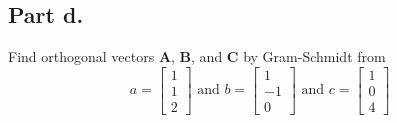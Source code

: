 \subsection{Part d.}
Find orthogonal vectors $\mathbf{A}$, $\mathbf{B}$, and $\mathbf{C}$ by
Gram-Schmidt from
\begin{equation}
    a = 
    \begin{bmatrix}
        1       \\
        1       \\
        2
    \end{bmatrix}
    \text{ and }
    b = 
    \begin{bmatrix}
        1       \\
        -1      \\
        0
    \end{bmatrix}
    \text{ and }
    c = 
    \begin{bmatrix}
        1       \\
        0       \\
        4
    \end{bmatrix}
\end{equation}

